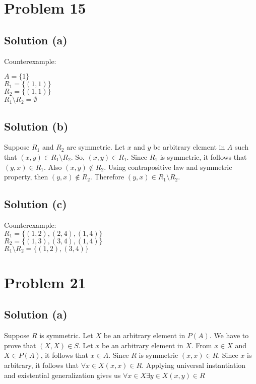 \documentclass{article}
\begin{document}
\section{Problem 15}

\subsection{Solution (a)}

Counterexample:

$A = \{1\}$ \\
$R_1 = \{(1,1)\}$ \\
$R_2 = \{(1,1)\}$ \\
$R_1 \setminus R_2 = \emptyset$

\subsection{Solution (b)}

Suppose $R_1$ and $R_2$ are symmetric. Let $x$ and $y$ be arbitrary
element in $A$ such that $(x,y) \in R_1 \setminus R_2$. So,
$(x,y) \in R_1$. Since $R_1$ is symmetric, it follows that
$(y,x) \in R_1$. Also $(x,y) \notin R_2$. Using contrapositive law and
symmetric property, then $(y,x) \notin R_2$. Therefore $(y,x) \in
R_1 \setminus R_2$.

\subsection{Solution (c)}

Counterexample: \\
$R_1 = \{(1,2),(2,4),(1,4)\}$ \\
$R_2 = \{(1,3),(3,4),(1,4)\}$ \\
$R_1 \setminus R_2 = \{(1,2), (3,4)\}$

\section{Problem 21}

\subsection{Solution (a)}

Suppose $R$ is symmetric. Let $X$ be an arbitrary element in $P(A)$.
We have to prove that $(X,X) \in S$. Let $x$ be an arbitrary element
in $X$. From $x \in X$ and $X \in P(A)$, it follows that $x \in A$.
Since $R$ is symmetric $(x,x) \in R$. Since $x$ is arbitrary, it
follows that $\forall x \in X (x,x) \in R$. Applying universal
instantiation and existential generalization gives us $\forall x \in X
\exists y \in X(x,y) \in R$
\end{document}
